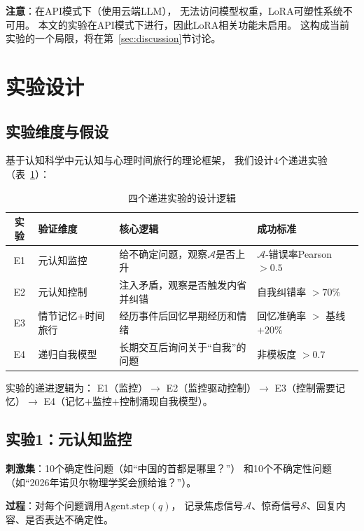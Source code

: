 \documentclass[11pt,a4paper]{article}
\newcommand{\surprise}{\mathcal{S}}
\newcommand{\anxiety}{\mathcal{A}}
\begin{document}
\textbf{注意}：在API模式下（使用云端LLM），
无法访问模型权重，LoRA可塑性系统不可用。
本文的实验在API模式下进行，因此LoRA相关功能未启用。
这构成当前实验的一个局限，将在第~\ref{sec:discussion}节讨论。

\section{实验设计}
\label{sec:experiments}

\subsection{实验维度与假设}

基于认知科学中元认知与心理时间旅行的理论框架，
我们设计4个递进实验（表~\ref{tab:experiments}）：

\begin{table}[htbp]
\centering
\caption{四个递进实验的设计逻辑}
\label{tab:experiments}
\begin{tabular}{clll}
\toprule
实验 & 验证维度 & 核心逻辑 & 成功标准 \\
\midrule
E1 & 元认知监控 & 给不确定问题，观察$\anxiety$是否上升 & $\anxiety$-错误率Pearson $> 0.5$ \\
E2 & 元认知控制 & 注入矛盾，观察是否触发内省并纠错 & 自我纠错率 $> 70\%$ \\
E3 & 情节记忆+时间旅行 & 经历事件后回忆早期经历和情绪 & 回忆准确率 $>$ 基线$+20\%$ \\
E4 & 递归自我模型 & 长期交互后询问关于``自我''的问题 & 非模板度 $> 0.7$ \\
\bottomrule
\end{tabular}
\end{table}

实验的递进逻辑为：
E1（监控）$\rightarrow$ E2（监控驱动控制）$\rightarrow$
E3（控制需要记忆）$\rightarrow$ E4（记忆+监控+控制涌现自我模型）。

\subsection{实验1：元认知监控}

\textbf{刺激集}：10个确定性问题（如``中国的首都是哪里？''）
和10个不确定性问题（如``2026年诺贝尔物理学奖会颁给谁？''）。

\textbf{过程}：对每个问题调用$\text{Agent.step}(q)$，
记录焦虑信号$\anxiety$、惊奇信号$\surprise$、回复内容、是否表达不确定性。
\end{document}
